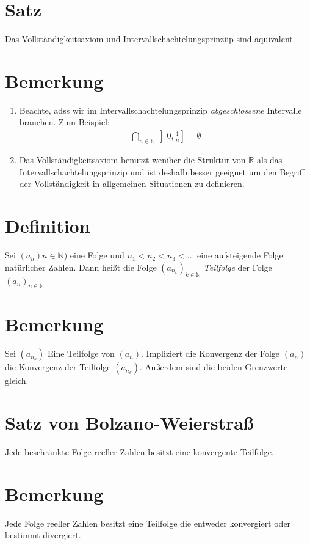 \documentclass{scrreprt}
\newcommand{\NN}{\mathbb{N}}
\newcommand{\RR}{\mathbb{R}}
\newcommand{\lecturedate}[1]{\pagebreak\rfoot{Lecture on: #1}}
\begin{document}
    \section{Satz}
    Das Vollständigkeitsaxiom und Intervallschachtelungsprinziip sind äquivalent.

    \lecturedate{18.11.2015}

    \section{Bemerkung}
    \begin{enumerate}
    	\item
    	Beachte, adss wir im Intervallschachtelungsprinzip \emph{abgeschlossene} Intervalle brauchen. Zum Beispiel:
    	\begin{align*}
    		\bigcap\limits_{n \in \NN} \left]0, \frac{1}{n}\right] = \emptyset
    	\end{align*}
    	\item
    	Das Vollständigkeitsaxiom benutzt weniher die Struktur von $\RR$ als das Intervallschachtelungsprinzip und ist deshalb besser geeignet um den Begriff der Vollständigkeit in allgemeinen Situationen zu definieren.
    \end{enumerate}

    \section{Definition}
    Sei $(a_n){n \in \NN})$ eine Folge und $n_1 < n_2 < n_3 < \dots$ eine aufsteigende Folge natürlicher Zahlen. Dann heißt die Folge $(a_{n_k})_{k \in \NN}$ \emph{Teilfolge} der Folge $(a_n)_{n \in \NN}$

    \section{Bemerkung}
    Sei $(a_{n_k})$ Eine Teilfolge von $(a_n)$. Impliziert die Konvergenz der Folge $(a_n)$ die Konvergenz der Teilfolge $(a_{n_k})$. Außerdem sind die beiden Grenzwerte gleich.

    \section{Satz von Bolzano-Weierstraß}
    Jede beschränkte Folge reeller Zahlen besitzt eine konvergente Teilfolge.

    \section{Bemerkung}
    Jede Folge reeller Zahlen besitzt eine Teilfolge die entweder konvergiert oder bestimmt divergiert.
\end{document}
